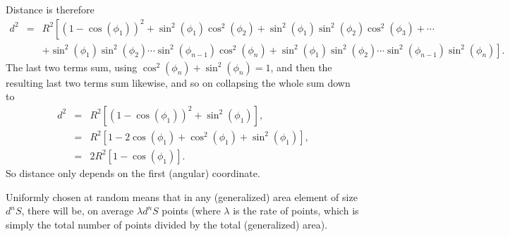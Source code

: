 Distance is therefore
\begin{eqnarray}
  \label{eq:d_nsphere}
  d^2 & = & R^2 \left[ 
                        (1-\cos(\phi_1))^2
                       + \sin^2 (\phi_1) \cos^2 (\phi_2 )
                       + \sin^2 (\phi_1) \sin^2 (\phi_2) \cos^2 (\phi_3 )
                       + \cdots \right.  \nonumber \\
     & &   \left.           + \sin^2 (\phi_1) \sin^2 (\phi_2) \cdots \sin^2 (\phi_{n-1}) \cos^2 (\phi_{n})
                       + \sin^2 (\phi_1) \sin^2 (\phi_2) \cdots \sin^2 (\phi_{n-1}) \sin^2 (\phi_{n}) 
                 \right].
\end{eqnarray}
The last two terms sum, using $\cos^2 (\phi_{n}) + \sin^2
(\phi_{n}) = 1$, and then the resulting last two terms sum
likewise, and so on collapsing the whole sum down to
\begin{eqnarray}
  \label{eq:d_nsphere}
  d^2 & = & R^2 \left[ 
                        (1-\cos(\phi_1))^2
                       + \sin^2 (\phi_1) \right], \nonumber \\
 & = & R^2 \left[ 1 - 2 \cos(\phi_1) + \cos^2(\phi_1)
                       + \sin^2 (\phi_1) \right], \nonumber \\
 & = & 2 R^2 \left[ 1 - \cos(\phi_1) \right].
\end{eqnarray}
So distance only depends on the first (angular) coordinate.


Uniformly chosen at random means that in any (generalized) area
element of size $d^{n}S$, there will be, on average $\lambda d^{n}S$
points (where $\lambda$ is the rate of points, which is simply the
total number of points divided by the total (generalized) area).

